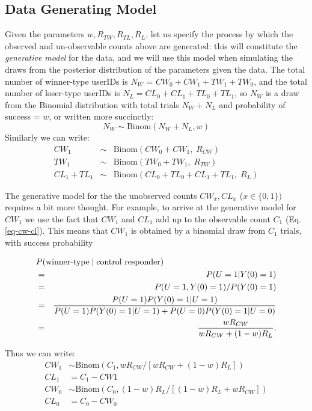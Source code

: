 \documentclass[11pt,a4paper]{article}
\theoremstyle{definition}
\theoremstyle{remark}
\theoremstyle{definition}
\theoremstyle{definition}
\theoremstyle{definition}
\theoremstyle{definition}
\theoremstyle{definition}
\theoremstyle{definition}
\begin{document}
\subsection{Data Generating Model}

Given the parameters $w, R_{TW}, R_{TL}, R_L$, let us specify the process by which the observed and un-observable counts above are generated: this will constitute the \textit{generative model} for the data, and we will use this model when simulating the draws from the posterior distribution of the parameters given the data.
\newcommand{\bindist}{\text{Binom}}
The total number of winner-type userIDs is $N_W$ = $CW_0 + CW_1 + TW_1 + TW_0$, and the total number of loser-type userIDs is 
$N_L = CL_0 + CL_1 + TL_0 + TL_1$, so $N_W$ is a draw from the Binomial distribution with total trials $N_W + N_L$ and probability of success = $w$, or written more succinctly:
\begin{equation}
N_W \sim \text{Binom}(N_W + N_L, w) \label{eq-like-w}
\end{equation}
Similarly we can write:
\begin{eqnarray}
CW_1 &\sim & \text{Binom}(CW_0 + CW_1, \; R_{CW})\\ \label{eq-like-rcw}
TW_1 &\sim &\text{Binom}(TW_0 + TW_1, \; R_{TW}) \\ \label{eq-like-rtw}
CL_1 + TL_1  & \sim & \text{Binom}(CL_0 + TL_0 + CL_1 + TL_1, \; R_L) \label{eq-like-rl}
\end{eqnarray}	

The generative model for the the unobserved counts $CW_x, CL_x$ ($x \in \{0,1\})$ requires a bit more thought. For example, to arrive at the generative model for $CW_1$ we use the fact that $CW_1$ and $CL_1$ add up to the observable count $C_1$ (Eq. \ref{eq-cw-cl}). This means that $CW_1$ is obtained by a binomial draw from $C_1$ trials, with success probability 

\begin{eqnarray}
\lefteqn{P(\text{winner-type} \;|\; \text{control responder}) }\\
    & = & P( U = 1 | Y(0) = 1) \\
	& = & P( U = 1, Y(0) = 1)/P(Y(0) = 1) \\
	& = & \frac{P( U = 1) P (Y(0) = 1 | U = 1)}
	      {P( U = 1) P (Y(0) = 1 | U = 1) + 
	   	   P( U = 0 ) P (Y(0) = 1 | U = 0)}\\
	& = & \frac{w R_{CW}}{w R_{CW} + (1-w)R_L}.
\end{eqnarray}	


Thus we can write:
\begin{equation} \label{eq-draw-cw-cl}
\begin{split}
CW_1 &\sim \text{Binom}(C_1, wR_{CW}/[ wR_{CW} + (1-w)R_L]) \\	
CL_1 &= C_1 - CW1\\
CW_0 &\sim  \text{Binom}(C_0, (1-w)R_{L}/[ (1-w)R_L + wR_{CW}]) \\
CL_0 & = C_0 - CW_0	
\end{split}	
\end{equation}
\end{document}
